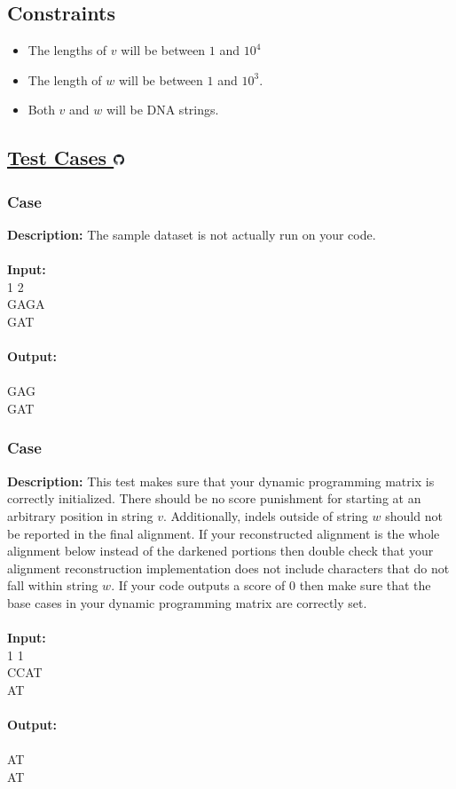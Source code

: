 \documentclass{article}
\newcommand{\code}[1]{{\fontfamily{pcr}\selectfont #1}}
\newcommand{\gitlogo}{\includegraphics[height=12.5]{c0/gitlogo.png}}
\begin{document}
\subsection*{Constraints}
\begin{itemize}
    \item The lengths of $v$ will be between $1$ and $10^4$
    \item The length of $w$ will be between $1$ and $10^3$.
    \item Both $v$ and $w$ will be DNA strings.
\end{itemize}
\pagebreak

\subsection*{\href{https://github.com/rjeveloff/BA_problemregister/tree/main/test_cases/chapter_5/5H}{Test Cases \gitlogo}}
\subsubsection*{Case }
\hline \vspace{5}
\textbf{Description:} The sample dataset is not actually run on your code.\\ \\
\noindent \textbf{Input:}\\
\code{1 1 2\\GAGA\\GAT}\\ \\
\noindent \textbf{Output:}\\
\code{1\\GAG\\GAT}

\subsubsection*{Case }
\hline \vspace{5}
\textbf{Description:} This test makes sure that your dynamic programming matrix is correctly initialized. There should be no score punishment for starting at an arbitrary position in string $v$. Additionally, indels outside of string $w$ should not be reported in the final alignment. If your reconstructed alignment is the whole alignment below instead of the darkened portions then double check that your alignment reconstruction implementation does not include characters that do not fall within string $w$. If your code outputs a score of $0$ then make sure that the base cases in your dynamic programming matrix are correctly set.\\ \\
\noindent \textbf{Input:}\\
\code{1 1 1\\CCAT\\AT}\\ \\
\noindent \textbf{Output:}\\
\code{2\\AT\\AT}
\pagebreak
\end{document}
